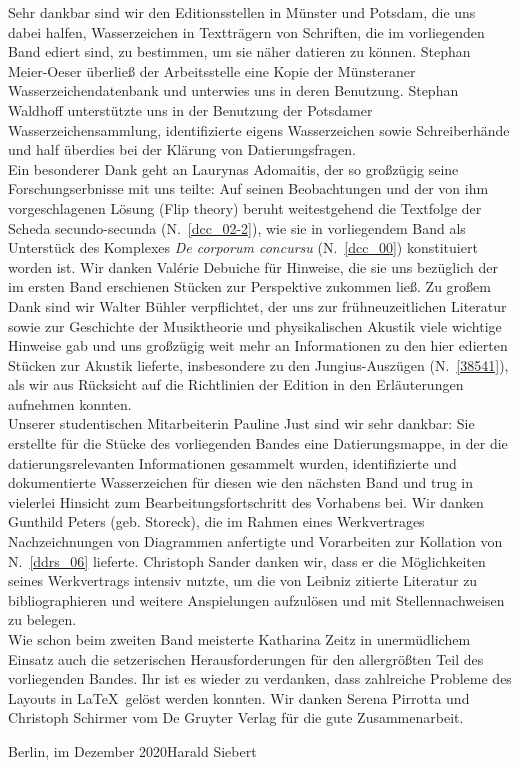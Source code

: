 Sehr dankbar sind wir den Editionsstellen in Münster und Potsdam, die uns dabei halfen, Wasserzeichen in Textträgern von Schriften, die im vorliegenden Band ediert sind, zu bestimmen, um sie näher datieren zu können. Stephan Meier-Oeser überließ der Arbeitsstelle eine Kopie der Münsteraner Wasserzeichendatenbank und unterwies uns in deren Benutzung. Stephan Waldhoff unterstützte uns in der Benutzung der Potsdamer Wasserzeichensammlung, identifizierte eigens Wasserzeichen sowie Schreiberhände und half überdies bei der Klärung von Datierungsfragen.
\\ \indent
Ein besonderer Dank geht an Laurynas Adomaitis, der so großzügig seine Forschungserbnisse mit uns teilte: Auf seinen Beobachtungen und der von ihm vorgeschlagenen Lösung (\glqq Flip theory\grqq) beruht weitestgehend die Textfolge der Scheda secundo-secunda (N.~\ref{dcc_02-2}), wie sie in vorliegendem Band als Unterstück des Komplexes \textit{De corporum concursu} (N.~\ref{dcc_00}) konstituiert worden ist. Wir danken Valérie Debuiche für Hinweise, die sie uns bezüglich der im ersten Band erschienen Stücken zur Perspektive zukommen ließ. 
Zu großem Dank sind wir Walter Bühler verpflichtet, der uns zur frühneuzeitlichen Literatur sowie zur Geschichte der Musiktheorie und physikalischen Akustik viele wichtige Hinweise gab und uns großzügig weit mehr an Informationen zu den hier edierten Stücken zur Akustik lieferte, insbesondere zu den Jungius-Auszügen (N.~\ref{38541}), als wir aus Rücksicht auf die Richtlinien der Edition in den Erläuterungen aufnehmen konnten.\\ \indent
Unserer studentischen Mitarbeiterin Pauline Just sind wir sehr dankbar: Sie erstellte für die Stücke des vorliegenden Bandes eine Datierungsmappe, in der die datierungsrelevanten Informationen gesammelt wurden, identifizierte und dokumentierte Wasserzeichen für diesen wie den nächsten Band und trug in vielerlei Hinsicht zum Bearbeitungsfortschritt des Vorhabens bei.  
Wir danken Gunthild Peters (geb. Storeck), die im Rahmen eines Werkvertrages Nachzeichnungen von Diagrammen anfertigte und Vorarbeiten zur Kollation von N.~\ref{ddrs_06} lieferte. 
Christoph Sander danken wir, dass er die Möglichkeiten seines Werkvertrags intensiv nutzte, um die von Leibniz zitierte Literatur zu bibliographieren und weitere Anspielungen aufzulösen und mit Stellennachweisen zu belegen.
\\ \indent
Wie schon beim zweiten Band meisterte Katharina Zeitz in unermüdlichem Einsatz auch die setzerischen Herausforderungen für den allergrößten Teil des vorliegenden Bandes. Ihr ist es wieder zu verdanken, dass zahlreiche Probleme des Layouts in \LaTeX\ gelöst werden konnten. 
Wir danken Serena Pirrotta und Christoph Schirmer vom De Gruyter Verlag für die gute Zusammenarbeit.
\par
\vspace{1em}
Berlin, im Dezember 2020\hspace{65mm}Harald Siebert
%
%